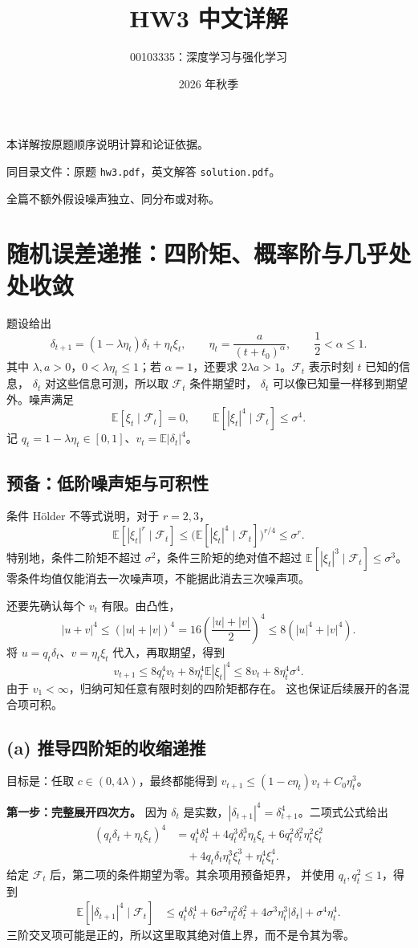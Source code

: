 \documentclass[UTF8,a4paper,11pt,fontset=fandol]{ctexart}
\title{HW3 中文详解}
\author{00103335：深度学习与强化学习}
\date{2026 年秋季}
\newcommand{\E}{\mathbb E}
\begin{document}
\pagestyle{plain}
\maketitle
本详解按原题顺序说明计算和论证依据。

同目录文件：原题 \texttt{hw3.pdf}，英文解答 \texttt{solution.pdf}。

全篇不额外假设噪声独立、同分布或对称。

\section{随机误差递推：四阶矩、概率阶与几乎处处收敛}
题设给出
\[
 \delta_{t+1}=(1-\lambda\eta_t)\delta_t+\eta_t\xi_t,
 \qquad\eta_t=\frac{a}{(t+t_0)^\alpha},\qquad\frac12<\alpha\leq1.
\]
其中 $\lambda,a>0$，$0<\lambda\eta_t\leq1$；若 $\alpha=1$，还要求
$2\lambda a>1$。$\mathcal F_t$ 表示时刻 $t$ 已知的信息，
$\delta_t$ 对这些信息可测，所以取 $\mathcal F_t$ 条件期望时，
$\delta_t$ 可以像已知量一样移到期望外。噪声满足
\[
 \E[\xi_t\mid\mathcal F_t]=0,
 \qquad\E[|\xi_t|^4\mid\mathcal F_t]\leq\sigma^4.
\]
记 $q_t=1-\lambda\eta_t\in[0,1]$、$v_t=\E|\delta_t|^4$。

\subsection*{预备：低阶噪声矩与可积性}
条件 H\"older 不等式说明，对于 $r=2,3$，
\[
 \E[|\xi_t|^r\mid\mathcal F_t]
 \leq\big(\E[|\xi_t|^4\mid\mathcal F_t]\big)^{r/4}
 \leq\sigma^r.
\]
特别地，条件二阶矩不超过 $\sigma^2$，条件三阶矩的绝对值不超过
$\E[|\xi_t|^3\mid\mathcal F_t]\leq\sigma^3$。
零条件均值仅能消去一次噪声项，不能据此消去三次噪声项。

还要先确认每个 $v_t$ 有限。由凸性，
\[
 |u+v|^4\leq(|u|+|v|)^4
 =16\left(\frac{|u|+|v|}{2}\right)^4
 \leq8(|u|^4+|v|^4).
\]
将 $u=q_t\delta_t$、$v=\eta_t\xi_t$ 代入，再取期望，得到
\[
 v_{t+1}\leq8q_t^4v_t+8\eta_t^4\E|\xi_t|^4
 \leq8v_t+8\eta_t^4\sigma^4.
\]
由于 $v_1<\infty$，归纳可知任意有限时刻的四阶矩都存在。
这也保证后续展开的各混合项可积。

\subsection*{(a) 推导四阶矩的收缩递推}
目标是：任取 $c\in(0,4\lambda)$，最终都能得到
$v_{t+1}\leq(1-c\eta_t)v_t+C_0\eta_t^3$。

\textbf{第一步：完整展开四次方。}
因为 $\delta_t$ 是实数，$|\delta_{t+1}|^4=\delta_{t+1}^4$。二项式公式给出
\begin{align*}
 (q_t\delta_t+\eta_t\xi_t)^4
 &=q_t^4\delta_t^4+4q_t^3\delta_t^3\eta_t\xi_t
   +6q_t^2\delta_t^2\eta_t^2\xi_t^2\\
 &\quad+4q_t\delta_t\eta_t^3\xi_t^3+\eta_t^4\xi_t^4.
\end{align*}
给定 $\mathcal F_t$ 后，第二项的条件期望为零。其余项用预备矩界，
并使用 $q_t,q_t^2\leq1$，得到
\begin{align*}
 \E[|\delta_{t+1}|^4\mid\mathcal F_t]
 &\leq q_t^4\delta_t^4+6\sigma^2\eta_t^2\delta_t^2
   +4\sigma^3\eta_t^3|\delta_t|+\sigma^4\eta_t^4.
\end{align*}
三阶交叉项可能是正的，所以这里取其绝对值上界，而不是令其为零。
\end{document}
